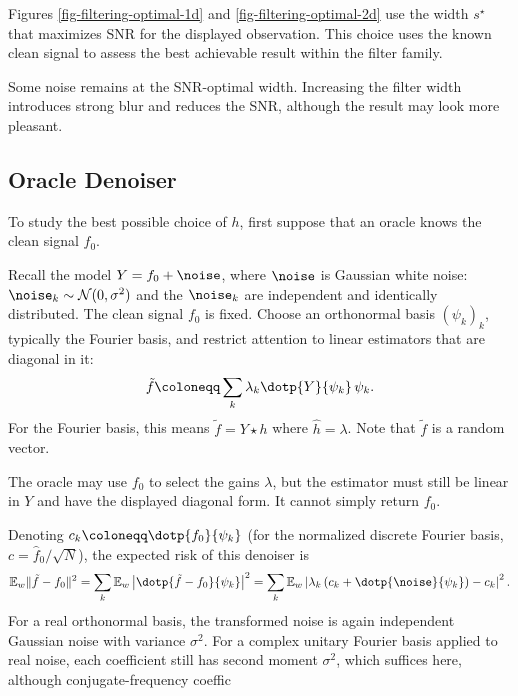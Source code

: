 Figures \ref{fig-filtering-optimal-1d} and \ref{fig-filtering-optimal-2d} use the width $s^\star$ that maximizes SNR for the displayed observation. This choice uses the known clean signal to assess the best achievable result within the filter family.



Some noise remains at the SNR-optimal width. Increasing the filter width introduces strong blur and reduces the SNR, although the result may look more pleasant.


                                                     
\subsection{Oracle Denoiser}

To study the best possible choice of $h$, first suppose that an oracle knows the clean signal $f_0$.
 
Recall the model $Y = f_0 + \noise$, where $\noise$ is Gaussian white noise: $\noise_k \sim \mathcal{N}(0, \sigma^2)$ and the $\noise_k$ are independent and identically distributed. The clean signal $f_0$ is fixed. Choose an orthonormal basis $(\psi_k)_k$, typically the Fourier basis, and restrict attention to linear estimators that are diagonal in it:
\begin{equation}\label{eq:linear-denoiser}
	\tilde{f} \coloneqq \sum_k \lambda_k \dotp{Y}{\psi_k} \, \psi_k.
\end{equation}
For the Fourier basis, this means $\tilde{f} = Y \star h$ where $\hat h=\lambda$. Note that $\tilde{f}$ is a random vector.
 
The oracle may use $f_0$ to select the gains $\lambda$, but the estimator must still be linear in $Y$ and have the displayed diagonal form. It cannot simply return $f_0$.

Denoting $c_k \coloneqq \dotp{f_0}{\psi_k}$ (for the normalized discrete Fourier basis, $c=\hat f_0/\sqrt N$), the expected risk of this denoiser is
$$
	\mathbb{E}_w \|\tilde{f} - f_0\|^2 = \sum_k \mathbb{E}_w \left| \dotp{\tilde{f} - f_0}{\psi_k} \right|^2  = \sum_k \mathbb{E}_w  \left| \lambda_k \left( c_k + \dotp{\noise}{\psi_k} \right) - c_k \right|^2 .
$$
For a real orthonormal basis, the transformed noise is again independent Gaussian noise with variance $\sigma^2$. For a complex unitary Fourier basis applied to real noise, each coefficient still has second moment $\sigma^2$, which suffices here, although conjugate-frequency coeffic